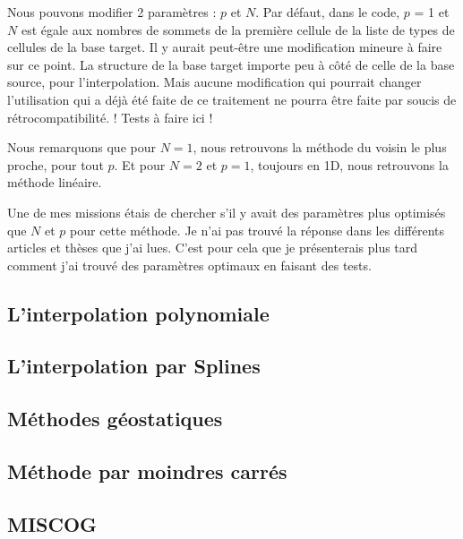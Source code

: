 Nous pouvons modifier 2 paramètres : \(p\) et \(N\).
Par défaut, dans le code, \(p\) = 1 et \(N\) est égale aux nombres de sommets de la première cellule de la liste de types de cellules de la base target. Il y aurait peut-être une modification mineure à faire sur ce point. La structure de la base target importe peu à côté de celle de la base source, pour l'interpolation. Mais aucune modification qui pourrait changer l'utilisation qui a déjà été faite de ce traitement ne pourra être faite par soucis de rétrocompatibilité. ! Tests à faire ici !



Nous remarquons que pour \( N = 1 \), nous retrouvons la méthode du voisin le plus proche, pour tout \( p \).
Et pour \( N = 2 \) et \( p = 1 \), toujours en 1D, nous retrouvons la méthode linéaire.

Une de mes missions étais de chercher s'il y avait des paramètres plus optimisés que \(N\) et \(p\) pour cette méthode. Je n'ai pas trouvé la réponse dans les différents articles et thèses que j'ai lues. C'est pour cela que je présenterais plus tard comment j'ai trouvé des paramètres optimaux en faisant des tests.


\subsection{L'interpolation polynomiale}
\subsection{L'interpolation par Splines}
\subsection{Méthodes géostatiques}
\subsection{Méthode par moindres carrés}
\subsection{MISCOG}

